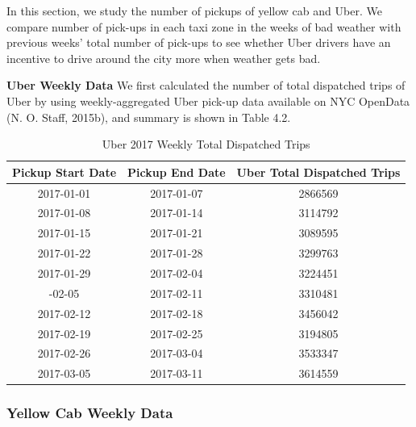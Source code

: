 \documentclass[12pt,twoside]{reedthesis}
\theoremstyle{definition}
\theoremstyle{definition}
\theoremstyle{definition}
\theoremstyle{remark}
\begin{document}
In this section, we study the number of pickups of yellow cab and Uber.
We compare number of pick-ups in each taxi zone in the weeks of bad
weather with previous weeks' total number of pick-ups to see whether
Uber drivers have an incentive to drive around the city more when
weather gets bad.

\textbf{Uber Weekly Data} We first calculated the number of total
dispatched trips of Uber by using weekly-aggregated Uber pick-up data
available on NYC OpenData (N. O. Staff, 2015b), and summary is shown in
Table 4.2.
\begin{table}

\caption{\label{tab:unnamed-chunk-62}Uber 2017 Weekly Total Dispatched Trips}
\centering
\begin{tabular}[t]{ccc}
\toprule
Pickup Start Date & Pickup End Date & Uber Total Dispatched Trips\\
\midrule
2017-01-01 & 2017-01-07 & 2866569\\
2017-01-08 & 2017-01-14 & 3114792\\
2017-01-15 & 2017-01-21 & 3089595\\
2017-01-22 & 2017-01-28 & 3299763\\
2017-01-29 & 2017-02-04 & 3224451\\
\addlinespace
2017-02-05 & 2017-02-11 & 3310481\\
2017-02-12 & 2017-02-18 & 3456042\\
2017-02-19 & 2017-02-25 & 3194805\\
2017-02-26 & 2017-03-04 & 3533347\\
2017-03-05 & 2017-03-11 & 3614559\\
\bottomrule
\end{tabular}
\end{table}
\subsubsection{Yellow Cab Weekly Data}\label{yellow-cab-weekly-data}
\end{document}
